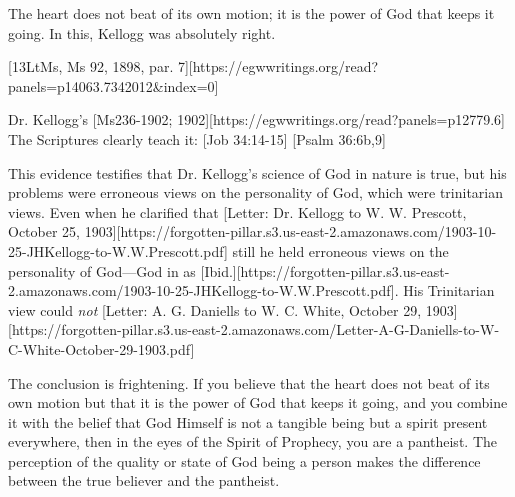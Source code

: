 The heart does not beat of its own motion; it is the power of God that keeps it going. In this, Kellogg was absolutely right.

[13LtMs, Ms 92, 1898, par. 7][https://egwwritings.org/read?panels=p14063.7342012&index=0]

Dr. Kellogg's [Ms236-1902; 1902][https://egwwritings.org/read?panels=p12779.6] The Scriptures clearly teach it: [Job 34:14-15] [Psalm 36:6b,9]

This evidence testifies that Dr. Kellogg's science of God in nature is true, but his problems were erroneous views on the personality of God, which were trinitarian views. Even when he clarified that [Letter: Dr. Kellogg to W. W. Prescott, October 25, 1903][https://forgotten-pillar.s3.us-east-2.amazonaws.com/1903-10-25-JHKellogg-to-W.W.Prescott.pdf] still he held erroneous views on the personality of God—God in  as [Ibid.][https://forgotten-pillar.s3.us-east-2.amazonaws.com/1903-10-25-JHKellogg-to-W.W.Prescott.pdf]. His Trinitarian view could \textit{not} [Letter: A. G. Daniells to W. C. White, October 29, 1903][https://forgotten-pillar.s3.us-east-2.amazonaws.com/Letter-A-G-Daniells-to-W-C-White-October-29-1903.pdf]

The conclusion is frightening. If you believe that the heart does not beat of its own motion but that it is the power of God that keeps it going, and you combine it with the belief that God Himself is not a tangible being but a spirit present everywhere, then in the eyes of the Spirit of Prophecy, you are a pantheist. The perception of the quality or state of God being a person makes the difference between the true believer and the pantheist.

